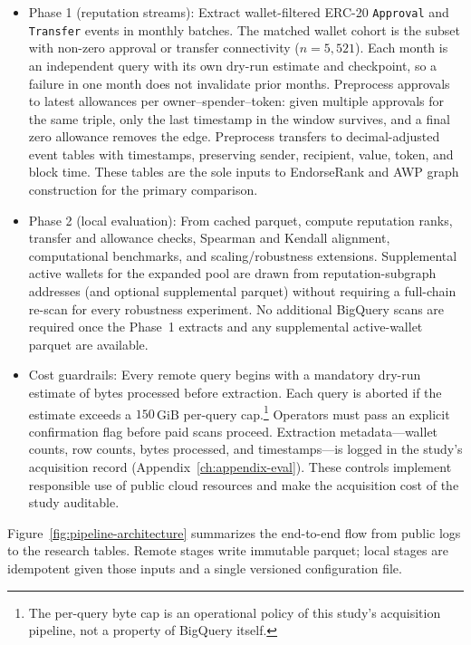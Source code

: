 \begin{itemize}
\item Phase 1 (reputation streams): Extract wallet-filtered ERC-20 \texttt{Approval} and \texttt{Transfer} events in monthly batches. The matched wallet cohort is the subset with non-zero approval or transfer connectivity ($n=5{,}521$). Each month is an independent query with its own dry-run estimate and checkpoint, so a failure in one month does not invalidate prior months. Preprocess approvals to latest allowances per owner--spender--token: given multiple approvals for the same triple, only the last timestamp in the window survives, and a final zero allowance removes the edge. Preprocess transfers to decimal-adjusted event tables with timestamps, preserving sender, recipient, value, token, and block time. These tables are the sole inputs to EndorseRank and AWP graph construction for the primary comparison.

\item Phase 2 (local evaluation): From cached parquet, compute reputation ranks, transfer and allowance checks, Spearman and Kendall alignment, computational benchmarks, and scaling/robustness extensions. Supplemental active wallets for the expanded pool are drawn from reputation-subgraph addresses (and optional supplemental parquet) without requiring a full-chain re-scan for every robustness experiment. No additional BigQuery scans are required once the Phase~1 extracts and any supplemental active-wallet parquet are available.

\item Cost guardrails: Every remote query begins with a mandatory dry-run estimate of bytes processed before extraction. Each query is aborted if the estimate exceeds a $150$\,GiB per-query cap.\footnote{The per-query byte cap is an operational policy of this study's acquisition pipeline, not a property of BigQuery itself.} Operators must pass an explicit confirmation flag before paid scans proceed. Extraction metadata---wallet counts, row counts, bytes processed, and timestamps---is logged in the study's acquisition record (Appendix~\ref{ch:appendix-eval}). These controls implement responsible use of public cloud resources and make the acquisition cost of the study auditable.

\end{itemize}


Figure~\ref{fig:pipeline-architecture} summarizes the end-to-end flow from public logs to the research tables. Remote stages write immutable parquet; local stages are idempotent given those inputs and a single versioned configuration file.

